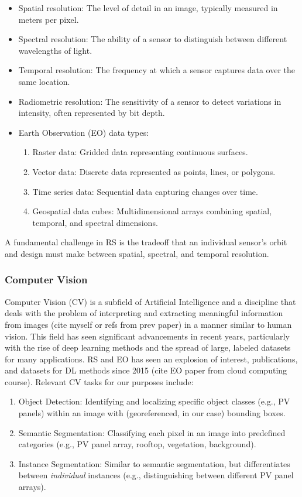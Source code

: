\begin{multicols}{2}
\begin{itemize}
    \item Spatial resolution: The level of detail in an image, typically measured in meters per pixel.
    \item Spectral resolution: The ability of a sensor to distinguish between different wavelengths of light.
    \item Temporal resolution: The frequency at which a sensor captures data over the same location.
    \item Radiometric resolution: The sensitivity of a sensor to detect variations in intensity, often represented by bit depth.
    \item Earth Observation (EO) data types:
        \begin{enumerate}
            \item Raster data: Gridded data representing continuous surfaces.
            \item Vector data: Discrete data represented as points, lines, or polygons.
            \item Time series data: Sequential data capturing changes over time.
            \item Geospatial data cubes: Multidimensional arrays combining spatial, temporal, and spectral dimensions.
        \end{enumerate}
\end{itemize}

A fundamental challenge in RS is the tradeoff that an individual sensor's orbit and design must make between spatial, spectral, and temporal resolution. 

\subsubsection{Computer Vision}

Computer Vision (CV) is a subfield of Artificial Intelligence and a discipline that deals with the problem of interpreting and extracting meaningful information from images (cite myself or refs from prev paper) 
in a manner similar to human vision. This field has seen significant advancements in recent years, particularly with the rise of deep learning methods and the spread of large, labeled datasets for many applications. 
RS and EO has seen an explosion of interest, publications, and datasets for DL methods since 2015 (cite EO paper from cloud computing course). Relevant CV tasks for our purposes include:

\begin{enumerate}
    \item Object Detection: Identifying and localizing specific object classes (e.g., PV panels) within an image with (georeferenced, in our case) bounding boxes.
    \item Semantic Segmentation: Classifying each pixel in an image into predefined categories (e.g., PV panel array, rooftop, vegetation, background).
    \item Instance Segmentation: Similar to semantic segmentation, but differentiates between \textit{individual} instances (e.g., distinguishing between different PV panel arrays). 
\end{enumerate}


\end{multicols}
